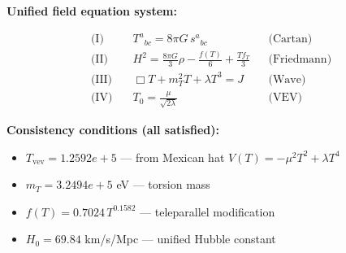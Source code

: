 
\textbf{Unified field equation system:}

\begin{align}
  \text{(I)} \quad & T^a{}_{bc} = 8\pi G \, s^a{}_{bc} && \text{(Cartan)} \\
  \text{(II)} \quad & H^2 = \frac{8\pi G}{3}\rho - \frac{f(T)}{6} + \frac{Tf_T}{3} && \text{(Friedmann)} \\
  \text{(III)} \quad & \Box T + m_T^2 T + \lambda T^3 = J && \text{(Wave)} \\
  \text{(IV)} \quad & T_0 = \frac{\mu}{\sqrt{2\lambda}} && \text{(VEV)}
\end{align}

\textbf{Consistency conditions (all satisfied):}
\begin{itemize}
  \item $T_{\text{vev}} = 1.2592e+5$ — from Mexican hat $V(T) = -\mu^2 T^2 + \lambda T^4$
  \item $m_T = 3.2494e+5$ eV — torsion mass
  \item $f(T) = 0.7024 \, T^{0.1582}$ — teleparallel modification
  \item $H_0 = 69.84$ km/s/Mpc — unified Hubble constant
\end{itemize}